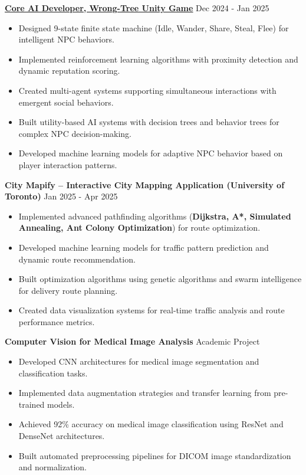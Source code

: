 \documentclass[letterpaper,10pt]{article}
\begin{document}
\vspace{0.2cm}
\noindent\href{https://github.com/XiuShw/Wrong-Tree}{\uline{
\textbf{Core AI Developer, Wrong-Tree Unity Game}}} \hfill Dec 2024 - Jan 2025
\begin{itemize}[leftmargin=0.2in]
    \item Designed 9-state finite state machine (Idle, Wander, Share, Steal, Flee) for intelligent NPC behaviors.
    \item Implemented reinforcement learning algorithms with proximity detection and dynamic reputation scoring.
    \item Created multi-agent systems supporting simultaneous interactions with emergent social behaviors.
    \item Built utility-based AI systems with decision trees and behavior trees for complex NPC decision-making.
    \item Developed machine learning models for adaptive NPC behavior based on player interaction patterns.
\end{itemize}

\vspace{0.2cm}
\noindent\textbf{City Mapify – Interactive City Mapping Application (University of Toronto)} \hfill Jan 2025 - Apr 2025
\begin{itemize}[leftmargin=0.2in]
    \item Implemented advanced pathfinding algorithms (\textbf{Dijkstra, A*, Simulated Annealing, Ant Colony Optimization}) for route optimization.
    \item Developed machine learning models for traffic pattern prediction and dynamic route recommendation.
    \item Built optimization algorithms using genetic algorithms and swarm intelligence for delivery route planning.
    \item Created data visualization systems for real-time traffic analysis and route performance metrics.
\end{itemize}

\vspace{0.2cm}
\noindent\textbf{Computer Vision for Medical Image Analysis} \hfill Academic Project
\begin{itemize}[leftmargin=0.2in]
    \item Developed CNN architectures for medical image segmentation and classification tasks.
    \item Implemented data augmentation strategies and transfer learning from pre-trained models.
    \item Achieved 92\% accuracy on medical image classification using ResNet and DenseNet architectures.
    \item Built automated preprocessing pipelines for DICOM image standardization and normalization.
\end{itemize}
\end{document}
